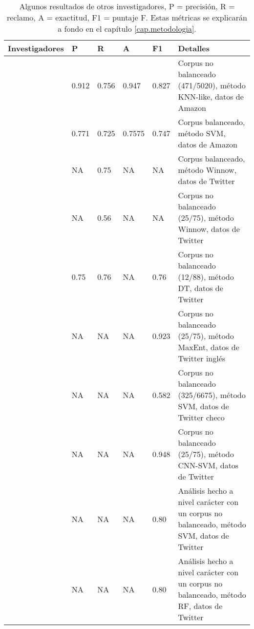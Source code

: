 \begin{table}[!ht]
	\begin{tabular}{|l|l|l|l|l|>{\raggedleft\arraybackslash}p{4cm}|}
		\hline
		Investigadores                  & P     & R     & A      & F1    & Detalles                                                                                  \\ \hline
		\textcite{davidov2010semi}      & 0.912 & 0.756 & 0.947  & 0.827 & Corpus no balanceado (471/5020), método  KNN-like, datos de Amazon                        \\ \hline
		\textcite{reyes2012making}      & 0.771 & 0.725 & 0.7575 & 0.747 & Corpus balanceado, método SVM, datos de  Amazon                                           \\ \hline
		\textcite{liebrecht2013perfect} & NA    & 0.75  & NA     & NA    & Corpus balanceado, método Winnow, datos de Twitter                                        \\ \hline
		\textcite{liebrecht2013perfect} & NA    & 0.56  & NA     & NA    & Corpus no balanceado (25/75), método Winnow, datos de Twitter                             \\ \hline
		\textcite{barbieri2014italian}  & 0.75  & 0.76  & NA     & 0.76  & Corpus no balanceado (12/88), método \gls{DT}, datos de  Twitter                          \\ \hline

		\textcite{ptavcek2014sarcasm}   & NA    & NA    & NA     & 0.923 & Corpus no balanceado (25/75), método  MaxEnt, datos de Twitter inglés                     \\ \hline
		\textcite{ptavcek2014sarcasm}   & NA    & NA    & NA     & 0.582 & Corpus no balanceado (325/6675), método  SVM, datos de Twitter checo                      \\ \hline
		\textcite{poria2016deeper}      & NA    & NA    & NA     & 0.948 & Corpus no balanceado (25/75), método  CNN-SVM, datos de Twitter                           \\ \hline
		\textcite{lopez2016character}   & NA    & NA    & NA     & 0.80  & Análisis hecho a nivel carácter con un corpus no balanceado, método SVM, datos de Twitter \\ \hline       \textcite{lopez2016character}      & NA        & NA     & NA        & 0.80     & Análisis hecho a nivel carácter con un corpus no balanceado, método RF, datos de Twitter                                                                                       \\ \hline
	\end{tabular}
	\caption{Algunos resultados de otros investigadores, P  = precisión, R = reclamo, A = exactitud, F1 = puntaje F. Estas métricas se explicarán a fondo en el capítulo \ref{cap.metodologia}.}
	\label{tab:resultados}
\end{table}

